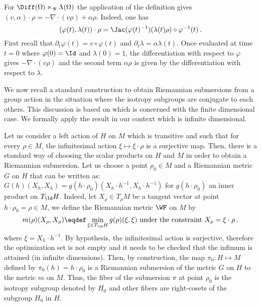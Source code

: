 \begin{example}\label{InfSemi}
For $\Diff(\Omega) \ltimes_\Psi \Lambda(\Omega)$ the application of the definition gives $(v,\alpha) \cdot \rho = -\nabla \cdot (v\rho) + \alpha \rho$. Indeed, one has
$$ (\varphi(t), \lambda(t)) \cdot \rho = \Jac(\varphi(t)^{-1}) (\lambda(t)\rho) \circ \varphi^{-1}(t)\,. $$
First recall that $\partial_t \varphi(t) = v \circ \varphi(t)$ and $\partial_t \lambda =\alpha \lambda(t)$.
Once evaluated at time $t=0$ where $\varphi(0) = \Id$ and $\lambda(0) = 1$, the differentiation with respect to $\varphi$ gives $-\nabla \cdot (v\rho)$ and the second term $\alpha \rho$ is given by the differentiation with respect to $\lambda$. 
\end{example}

We now recall a standard construction to obtain Riemannian submersions from a group action in the situation where the isotropy subgroups are conjugate to each others. This discussion is based on \cite[Section 29.21]{Michor2008b} which is concerned with the finite dimensional case. We formally apply the result in our context which is infinite dimensional.

Let us consider a left action of $H$ on $M$ which is transitive and such that for every $\rho \in M$, the infinitesimal action $\xi \mapsto \xi \cdot \rho$ is a surjective map. Then,
there is a standard way of choosing the scalar products on $H$ and $M$ in order to obtain a Riemannian submersion. Let us choose a point $\rho_0  \in M$ and a Riemannian metric $G$ on $H$ that can be written as: $G(h)(X_h,X_h) =  g(h\cdot \rho_0)(X_h \cdot h^{-1},X_h \cdot h^{-1})$ for $ g(h\cdot \rho_0)$ an inner product on $T_{\Id}H$. 
Indeed,
let $X_\rho \in T_\rho M$ be a tangent vector at point $h\cdot \rho_0 = \rho \in M$, we define the Riemannian metric $\WF$ on $M$ by
\begin{equation}\label{HLift}
m(\rho)(X_\rho,X_\rho) \eqdef \min_{\xi \in T_{\Id} H} g(\rho)(\xi,\xi) \text{ under the constraint } X_\rho = \xi \cdot \rho \,.
\end{equation}
where $\xi = X_h \cdot h^{-1}$. By hypothesis, the infinitesimal action is surjective, therefore the optimization set is not empty and it needs to be checked that the infimum is attained (in infinite dimensions). Then, by construction, the map $\pi_0: H \mapsto M$ defined by $\pi_0(h) = h\cdot \rho_0$ is a Riemannian submersion of the metric $G$ on $H$ to the metric $m$ on $M$.
Thus, the fiber of the submersion $\pi$ at point $\rho_0$ is the isotropy subgroup denoted by $H_0$ and other fibers are right-cosets of the subgroup $H_0$ in $H$.





